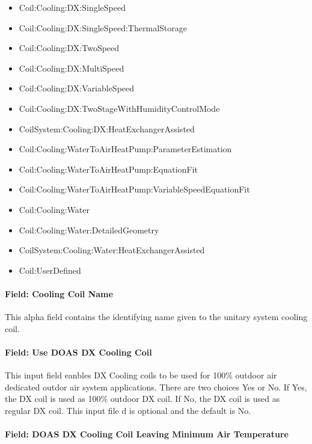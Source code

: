 \begin{itemize}
\item
  Coil:Cooling:DX:SingleSpeed
\item
  Coil:Cooling:DX:SingleSpeed:ThermalStorage
\item
  Coil:Cooling:DX:TwoSpeed
\item
  Coil:Cooling:DX:MultiSpeed
\item
  Coil:Cooling:DX:VariableSpeed
\item
  Coil:Cooling:DX:TwoStageWithHumidityControlMode
\item
  CoilSystem:Cooling:DX:HeatExchangerAssisted
\item
  Coil:Cooling:WaterToAirHeatPump:ParameterEstimation
\item
  Coil:Cooling:WaterToAirHeatPump:EquationFit
\item
  Coil:Cooling:WaterToAirHeatPump:VariableSpeedEquationFit
\item
  Coil:Cooling:Water
\item
  Coil:Cooling:Water:DetailedGeometry
\item
  CoilSystem:Cooling:Water:HeatExchangerAssisted
\item
  Coil:UserDefined
\end{itemize}

\paragraph{Field: Cooling Coil Name}\label{field-cooling-coil-name-002}

This alpha field contains the identifying name given to the unitary system cooling coil.

\paragraph{Field: Use DOAS DX Cooling Coil}\label{field-use-doas-dx-cooling-coil}

This input field eanbles DX Cooling coils to be used for 100\% outdoor air dedicated outdor air system applications. There are two choices Yes or No. If Yes, the DX coil is used as 100\% outdoor DX coil. If No, the DX coil is used as regular DX coil. This input file d is optional and the default is No.

\paragraph{Field: DOAS DX Cooling Coil Leaving Minimum Air Temperature}\label{field-doas-dx-cooling-coil-leaving-minimum-air-temperature}

